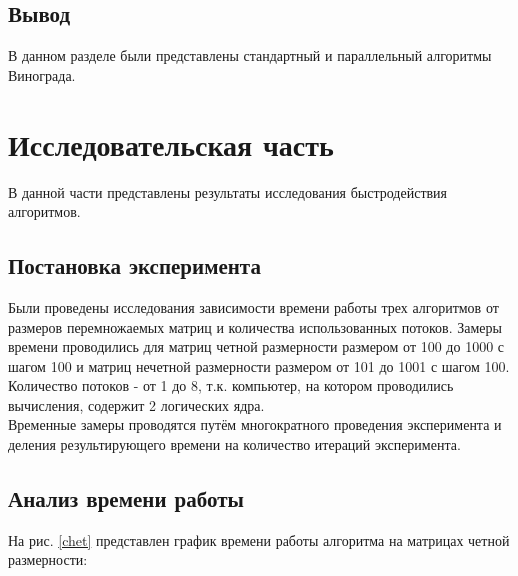 \documentclass[a4paper, 14pt]{article}
\begin{document}
	\subsection{Вывод}
	В данном разделе были представлены стандартный и параллельный алгоритмы Винограда.

	\newpage
	\section{Исследовательская часть}
	В данной части представлены результаты  исследования быстродействия алгоритмов.\\

	\subsection{Постановка эксперимента}
	
	Были проведены исследования зависимости времени работы трех алгоритмов от размеров перемножаемых матриц и количества использованных потоков. Замеры времени проводились для матриц четной размерности размером от 100 до 1000 с шагом 100 и матриц нечетной размерности размером от 101 до 1001 с шагом 100. Количество потоков - от 1 до 8, т.к. компьютер, на котором проводились вычисления, содержит 2 логических ядра.\\
	
	 Временные замеры проводятся путём многократного проведения эксперимента и деления результирующего времени на количество итераций эксперимента. \\
	
	\newpage
	\subsection{Анализ времени работы}
	
	На рис. \ref{chet} представлен график времени работы алгоритма на матрицах четной размерности:
	
\end{document}
